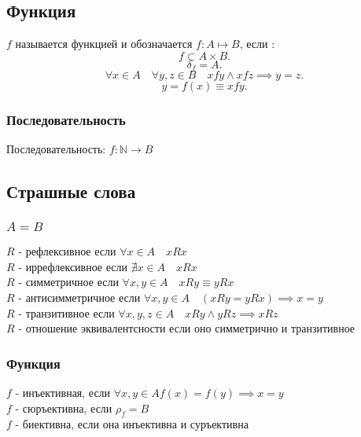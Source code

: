 \documentclass[11pt, oneside]{article}   	%
\begin{document}
    \subsection{Функция}
        $f$ называется функцией и обозначается  $f: A \mapsto B$, если :
        \[ f \subset A \times B .\] 
        \[ \delta_f = A .\]
        \[ \forall{x \in A}\quad\forall{y, z \in B}\quad xfy\land xfz \implies y=z .\]
        \[ y=f(x) \equiv xfy .\]
        \subsubsection{Последовательность}
            Последовательность: $f : \mathbb{N} \to B$ 

    \subsection{Страшные слова}
        \subsubsection{$A = B$}
            $R$ - рефлексивное если  $\forall{x \in A}\quad xRx$\\ 
            $R$ -  иррефлексивное если $\nexists{x \in A}\quad xRx$\\
            $R$ - симметричное если  $\forall{x, y \in A}\quad xRy \equiv yRx$\\
            $R$ - антисимметричное если  $\forall{x, y \in A}\quad \left(xRy = yRx\right) \implies x=y$ \\
            $R$ - транзитивное если $\forall{x, y, z \in A}\quad xRy\land yRz \implies xRz$\\
            $R$ - отношение эквивалентсности если оно симметрично и транзитивное\\
        \subsubsection{Функция}
            $f$ - инъективная, если  $\forall{x, y \in A} f(x) = f(y) \implies x = y$\\ 
            $f$ - сюръективна, если  $\rho_f = B$\\
            $f$ - биективна, если она инъективна и суръективна
\end{document}
